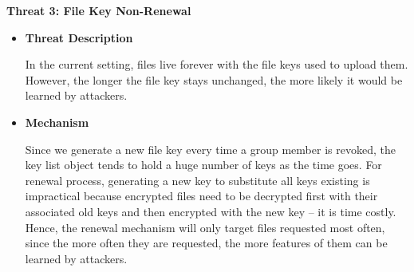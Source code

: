 \documentclass[letterpaper,11pt]{article}
\newcommand{\resheading}[1]{{\large \colorbox{mygrey}{\begin{minipage}{\textwidth}{\textbf{#1 \vphantom{p\^{E}}}}\end{minipage}}}}
\begin{document}
\begin{itemize}[noitemsep,topsep=0pt,parsep=1pt,partopsep=1pt]
	\end{itemize}
    \vspace{0.1in}
    
    \resheading{Threat 3: File Key Non-Renewal }
    \vspace{0.1in}
    \begin{itemize}[noitemsep,topsep=0pt,parsep=1pt,partopsep=1pt]
    	\item\textbf{Threat Description}
    	\begin{flushleft}
			In the current setting, files live forever with the file keys used to upload them. However, the longer the file key stays unchanged, the more likely it would be learned by attackers.    
    	\end{flushleft}
    	\item\textbf{Mechanism}
    	\begin{flushleft}
			Since we generate a new file key every time a group member is revoked, the key list object tends to hold a huge number of keys as the time goes. For renewal process, generating a new key to substitute all keys existing is impractical because encrypted files need to be decrypted first with their associated old keys and then encrypted with the new key -- it is time costly. Hence, the renewal mechanism will only target files requested most often, since the more often they are requested, the more features of them can be learned by attackers.      
    	\end{flushleft}
    	\end{itemize}
\end{document}
